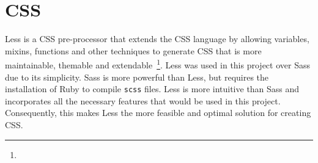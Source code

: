 \section{CSS} {
\label{sec:css}

	Less is a CSS pre-processor that extends the CSS language by allowing variables, mixins, functions and other techniques to generate CSS that is more maintainable, themable and extendable~\footnote{}. Less was used in this project over Sass due to its simplicity. Sass is more powerful than Less, but requires the installation of Ruby to compile \texttt{scss} files. Less is more intuitive than Sass and incorporates all the necessary features that would be used in this project. Consequently, this makes Less the more feasible and optimal solution for creating CSS.

}

